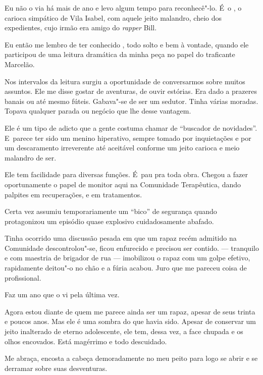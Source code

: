  

Eu não o via há mais de ano e levo algum tempo para reconhecê"-lo. É~o
, o carioca simpático de Vila Isabel, com aquele jeito malandro, cheio
dos expedientes, cujo irmão era amigo do \emph{rapper}  Bill.

Eu então me lembro de ter conhecido , todo solto e bem à vontade,
quando ele participou de uma leitura dramática da minha peça no papel do
traficante Marcelão.

Nos intervalos da leitura surgiu a oportunidade de conversarmos sobre
muitos assuntos. Ele me disse gostar de aventuras, de ouvir estórias.
Era dado a prazeres banais ou até mesmo fúteis. Gabava"-se de ser um
sedutor. Tinha várias moradas. Topava qualquer parada ou negócio que lhe
desse vantagem.

Ele é um tipo de adicto que a gente costuma chamar de ``buscador de
novidades''. E~parece ter sido um menino hiperativo, sempre tomado por
inquietações e por um descaramento irreverente até aceitável conforme um
jeito carioca e meio malandro de ser.

Ele tem facilidade para diversas funções. É~pau pra toda obra. Chegou a
fazer oportunamente o papel de monitor aqui na Comunidade Terapêutica,
dando palpites em recuperações, e em tratamentos.

Certa vez assumiu temporariamente um ``bico'' de segurança quando
protagonizou um episódio quase explosivo cuidadosamente abafado.

Tinha ocorrido uma discussão pesada em que um rapaz recém admitido na
Comunidade descontrolou"-se, ficou enfurecido e precisou ser contido. 
--- tranquilo e com maestria de brigador de rua --- imobilizou o rapaz
com um golpe efetivo, rapidamente deitou"-o no chão e a fúria acabou.
Juro que me pareceu coisa de profissional.

\asterisc{}

Faz um ano que o vi pela última vez.

Agora estou diante de quem me parece ainda ser um rapaz, apesar de seus
trinta e poucos anos. Mas ele é uma sombra do que havia sido. Apesar de
conservar um jeito inalterado de eterno adolescente, ele tem, dessa vez,
a face chupada e os olhos encovados. Está magérrimo e todo descuidado.

Me abraça, encosta a cabeça demoradamente no meu peito para logo se
abrir e se derramar sobre suas desventuras.

